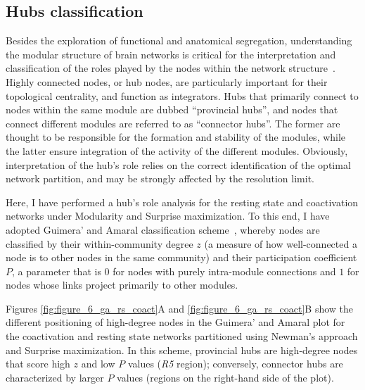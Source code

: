\subsection{Hubs classification}
Besides the exploration of functional and anatomical segregation, understanding the modular structure of brain networks is critical for the interpretation and classification of the roles played by the nodes within the network structure~\cite{sporns2007}. Highly connected nodes, or hub nodes, are particularly important for their topological centrality, and function as integrators. Hubs that primarily connect to nodes within the same module are dubbed ``provincial hubs'', and nodes that connect different modules are referred to as ``connector hubs''. The former are thought to be responsible for the formation and stability of the modules, while the latter ensure integration of the activity of the different modules. Obviously, interpretation of the hub's role relies on the correct identification of the optimal network partition, and may be strongly affected by the resolution limit.

Here, I have performed a hub's role analysis for the resting state and coactivation networks under Modularity and Surprise maximization.
To this end, I have adopted Guimera' and Amaral classification scheme~\cite{guimera2005}, whereby nodes are classified by their within-community degree $z$ (a measure of how well-connected a node is to other nodes in the same community) and their participation coefficient $P$, a parameter that is $0$ for nodes with purely intra-module connections and $1$ for nodes whose links project primarily to other modules. 

Figures \ref{fig:figure_6_ga_rs_coact}A and \ref{fig:figure_6_ga_rs_coact}B show the different positioning of high-degree nodes in the Guimera' and Amaral plot for the coactivation and resting state networks partitioned using Newman’s approach and Surprise maximization. In this scheme, provincial hubs are high-degree nodes that score high $z$ and low $P$ values (\emph{R5} region); conversely, connector hubs are characterized by larger $P$ values (regions on the right-hand side of the plot).

